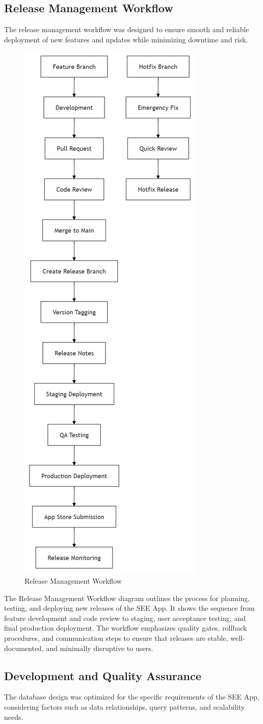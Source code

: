 \documentclass[12pt,a4paper]{article}
\newcommand{\sectiontitle}[1]{\subsection{#1}}
\begin{document}
\sectiontitle{Release Management Workflow}

The release management workflow was designed to ensure smooth and reliable deployment of new features and updates while minimizing downtime and risk.

\begin{figure}[H]
    \centering
    \includegraphics[height=0.7\textwidth,keepaspectratio]{redrawn_diagrams/Figure8_Release_Workflow.png}
    \caption{Release Management Workflow}
    \label{fig:release-workflow}
\end{figure}
\vspace{0.5em}
The Release Management Workflow diagram outlines the process for planning, testing, and deploying new releases of the SEE App. It shows the sequence from feature development and code review to staging, user acceptance testing, and final production deployment. The workflow emphasizes quality gates, rollback procedures, and communication steps to ensure that releases are stable, well-documented, and minimally disruptive to users.

\sectiontitle{Development and Quality Assurance}

The database design was optimized for the specific requirements of the SEE App, considering factors such as data relationships, query patterns, and scalability needs.
\end{document}
